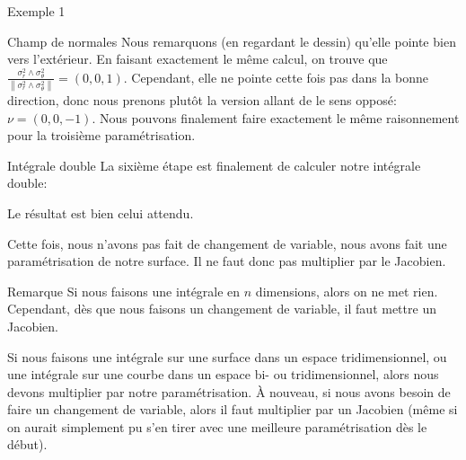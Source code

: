 \documentclass[a4paper]{article}
\begin{document}
\begin{parag}{Exemple 1}
\begin{subparag}{Champ de normales}
        Nous remarquons (en regardant le dessin) qu'elle pointe bien vers l'extérieur. En faisant exactement le même calcul, on trouve que $\frac{\sigma_r^2 \wedge \sigma_{\theta}^2}{\left\|\sigma_r^2 \wedge \sigma_{\theta}^2\right\|} = \left(0, 0, 1\right)$. Cependant, elle ne pointe cette fois pas dans la bonne direction, donc nous prenons plutôt la version allant de le sens opposé: $\nu = \left(0, 0, -1\right)$. Nous pouvons finalement faire exactement le même raisonnement pour la troisième paramétrisation.
    \end{subparag}
    
    \begin{subparag}{Intégrale double}
        La sixième étape est finalement de calculer notre intégrale double: 

        Le résultat est bien celui attendu.
        
        Cette fois, nous n'avons pas fait de changement de variable, nous avons fait une paramétrisation de notre surface. Il ne faut donc pas multiplier par le Jacobien.
    \end{subparag}
\end{parag}

\begin{parag}{Remarque}
    Si nous faisons une intégrale en $n$ dimensions, alors on ne met rien. Cependant, dès que nous faisons un changement de variable, il faut mettre un Jacobien.

    Si nous faisons une intégrale sur une surface dans un espace tridimensionnel, ou une intégrale sur une courbe dans un espace bi- ou tridimensionnel, alors nous devons multiplier par notre paramétrisation. À nouveau, si nous avons besoin de faire un changement de variable, alors il faut multiplier par un Jacobien (même si on aurait simplement pu s'en tirer avec une meilleure paramétrisation dès le début).
\end{parag}
\end{document}
